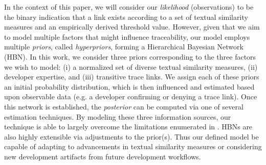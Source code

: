 In the context of this paper, we will consider our \textit{likelihood} (observations) to be the binary indication that a link exists according to a set of textual similarity measures and an empirically derived threshold value. However, given that we aim to model multiple factors that might influence traceability, our model employs multiple \textit{priors}, called \textit{hyperpriors}, forming a Hierarchical Bayesian Network (HBN). In this work, we consider three priors corresponding to the three factors we wish to model: (i) a normalized set of diverse textual similarity measures, (ii) developer expertise, and (iii) transitive trace links. We assign each of these priors an initial probability distribution, which is then influenced and estimated based upon observable data (e.g. a developer confirming or denying a trace link). Once this network is established, the \textit{posterior} can be computed via one of several estimation techniques. By modeling these three information sources, our technique is able to largely overcome the limitations enumerated in  . HBNs are also highly extensible via adjustments to the prior(s). Thus our defined model be capable of adapting to advancements in textual similarity measures or considering new development artifacts from future development workflows.
